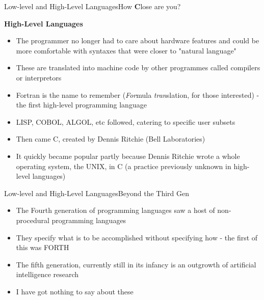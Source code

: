 \documentclass{beamer}
\begin{document}
\begin{frame}{Low-level and High-Level Languages}{How \textbf{C}lose are you?}
\begin{center}
\textbf{High-Level Languages}
\end{center}
\begin{itemize}
\item<1-> The programmer no longer had to care about hardware features and could be more comfortable with syntaxes that were closer to "natural language"
\item<2-> These are translated into machine code by other programmes called compilers or interpretors
\item<3-> Fortran is the name to remember (\emph{For}mula \emph{tran}slation, for those interested) - the first high-level programming language
\item<4-> LISP, COBOL, ALGOL, etc followed, catering to specific user subsets
\item<5-> Then came C, created by Dennis Ritchie (Bell Laboratories)
\item<6-> It quickly became popular partly because Dennis Ritchie wrote a whole operating system, the UNIX, in C (a practice previously unknown in high-level languages)
\end{itemize}
\end{frame}

\begin{frame}{Low-level and High-Level Languages}{Beyond the Third Gen}
\begin{itemize}
\item<1-> The Fourth generation of programming languages saw a host of non-procedural programming languages
\item<1-> They specify what is to be accomplished without specifying how - the first of this was FORTH
\item<2-> The fifth generation, currently still in its infancy is an outgrowth of artificial intelligence research
\item<2-> I have got nothing to say about these
\end{itemize}
\end{frame}
\end{document}
